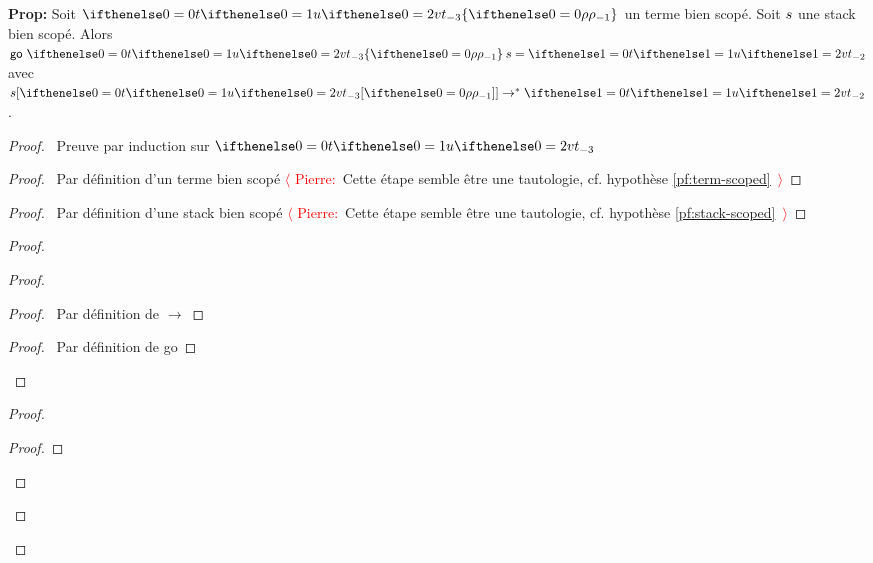 \documentclass[a4paper]{article}
\newcommand{\TODO}[1]{\textcolor{red}{$\langle$ Pierre:}~#1\textcolor{red}{~$\rangle$}}
\begin{document}
\textbf{Prop:}
Soit $\scoped \aTerm \env$ un terme bien scopé. Soit $s$ une stack bien scopé.
Alors $\go {\scoped \aTerm \env} \aStack = \aTerm[1]$ avec $\stackapp \aStack {\subs \aTerm \env} \to^* \aTerm[1]$.
\begin{proof}
  \pfsketch\ Preuve par induction sur $\aTerm$
  \prove{$\stackapp \aStack {\subs \aTerm \env} \to^* \go {\scoped \aTerm \env} \aStack$ }
  \begin{proof}
    \pf\ Par définition d'un terme bien scopé \TODO{Cette étape semble être une tautologie, cf. hypothèse \ref{pf:term-scoped}}
  \end{proof}
  \begin{proof}
    \pf\ Par définition d'une stack bien scopé \TODO{Cette étape semble être une tautologie, cf. hypothèse \ref{pf:stack-scoped}}
  \end{proof}
  \begin{proof}
    \begin{proof}
      \begin{proof}
        \pf\ Par définition de $\to$
      \end{proof}
      \begin{proof}
        \pf\ Par définition de \textsf{go}
      \end{proof}
    \end{proof}
    \begin{proof}
      \begin{proof}

\end{proof}
\end{proof}
\end{proof}
\end{proof}
\end{document}
